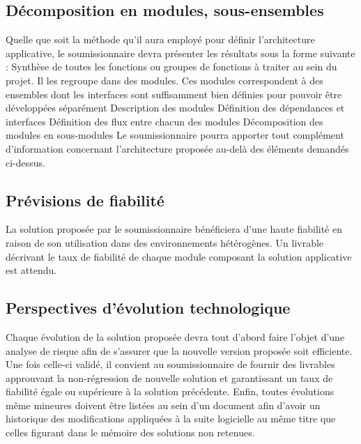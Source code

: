 \documentclass[11pt,fleqn]{book} %
\begin{document}
\subsection{Décomposition en modules, sous-ensembles}
Quelle que soit la méthode qu’il aura employé pour définir l’architecture applicative, le 
soumissionnaire devra présenter les résultats sous la forme suivante : 
Synthèse de toutes les fonctions ou groupes de fonctions à traiter au sein du projet. Il les regroupe dans des modules. Ces modules correspondent à des ensembles dont les interfaces sont suffisamment bien définies pour pouvoir être développées séparément
Description des modules
Définition des dépendances et interfaces
Définition des flux entre chacun des modules 
Décomposition des modules en sous-modules
Le soumissionnaire pourra apporter tout complément d’information concernant l’architecture proposée au-delà des éléments demandés ci-dessus. 

\subsection{Prévisions de fiabilité}
La solution proposée par le soumissionnaire bénéficiera d'une haute fiabilité en raison de son utilisation dans des environnements hétérogènes.
Un livrable décrivant le taux de fiabilité de chaque module composant la solution applicative est attendu.

\subsection{Perspectives d'évolution technologique}
Chaque évolution de la solution proposée devra tout d'abord faire l'objet d'une analyse de risque afin de s'assurer que la nouvelle version proposée soit efficiente.
Une fois celle-ci validé, il convient au soumissionnaire de fournir des livrables approuvant la non-régression de nouvelle solution et garantissant un taux de fiabilité égale ou supérieure à la solution précédente.
Enfin, toutes évolutions même mineures doivent être listées au sein d'un document afin d'avoir un historique des modifications appliquées à la suite logicielle au même titre que celles figurant dans le mémoire des solutions non retenues.


\end{document}
